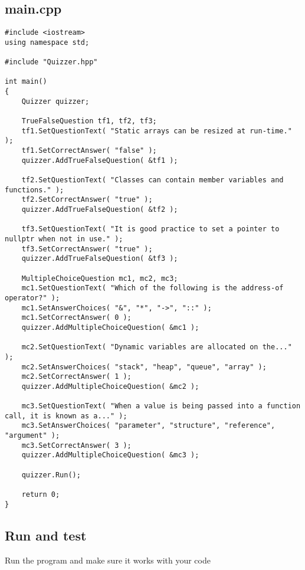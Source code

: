 \documentclass[a4paper,12pt]{book}
\begin{document}
            \subsection*{main.cpp}
\begin{lstlisting}[style=code]
#include <iostream>
using namespace std;

#include "Quizzer.hpp"

int main()
{
    Quizzer quizzer;

    TrueFalseQuestion tf1, tf2, tf3;
    tf1.SetQuestionText( "Static arrays can be resized at run-time." );
    tf1.SetCorrectAnswer( "false" );
    quizzer.AddTrueFalseQuestion( &tf1 );

    tf2.SetQuestionText( "Classes can contain member variables and functions." );
    tf2.SetCorrectAnswer( "true" );
    quizzer.AddTrueFalseQuestion( &tf2 );

    tf3.SetQuestionText( "It is good practice to set a pointer to nullptr when not in use." );
    tf3.SetCorrectAnswer( "true" );
    quizzer.AddTrueFalseQuestion( &tf3 );

    MultipleChoiceQuestion mc1, mc2, mc3;
    mc1.SetQuestionText( "Which of the following is the address-of operator?" );
    mc1.SetAnswerChoices( "&", "*", "->", "::" );
    mc1.SetCorrectAnswer( 0 );
    quizzer.AddMultipleChoiceQuestion( &mc1 );

    mc2.SetQuestionText( "Dynamic variables are allocated on the..." );
    mc2.SetAnswerChoices( "stack", "heap", "queue", "array" );
    mc2.SetCorrectAnswer( 1 );
    quizzer.AddMultipleChoiceQuestion( &mc2 );

    mc3.SetQuestionText( "When a value is being passed into a function call, it is known as a..." );
    mc3.SetAnswerChoices( "parameter", "structure", "reference", "argument" );
    mc3.SetCorrectAnswer( 3 );
    quizzer.AddMultipleChoiceQuestion( &mc3 );

    quizzer.Run();

    return 0;
}
\end{lstlisting}

            \newpage{}
            \subsection*{ Run and test }

                Run the program and make sure it works with your code
\end{document}
